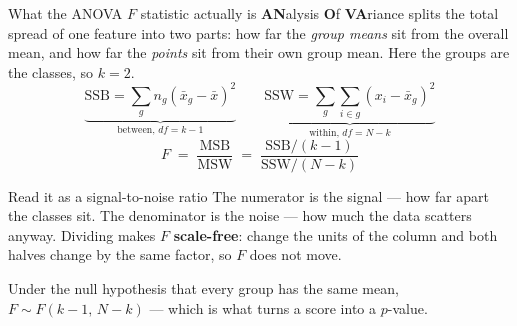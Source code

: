 \documentclass[aspectratio=169]{beamer}
\begin{document}
\begin{frame}[shrink=6]{What the ANOVA $F$ statistic actually is}
\textbf{AN}alysis \textbf{O}f \textbf{VA}riance splits the total spread of one
feature into two parts: how far the \emph{group means} sit from the overall
mean, and how far the \emph{points} sit from their own group mean. Here the
groups are the classes, so $k=2$.
\vspace{-0.2em}
\[
  \underbrace{\text{SSB} = \sum_{g} n_g (\bar{x}_g - \bar{x})^2}_{\text{between, } df = k-1}
  \qquad
  \underbrace{\text{SSW} = \sum_{g}\sum_{i \in g} (x_i - \bar{x}_g)^2}_{\text{within, } df = N-k}
\]
\[
  F \;=\; \frac{\text{MSB}}{\text{MSW}}
    \;=\; \frac{\text{SSB}/(k-1)}{\text{SSW}/(N-k)}
\]
\begin{block}{Read it as a signal-to-noise ratio}
  \small The numerator is the signal --- how far apart the classes sit. The
  denominator is the noise --- how much the data scatters anyway. Dividing
  makes $F$ \textbf{scale-free}: change the units of the column and both
  halves change by the same factor, so $F$ does not move.
\end{block}
\vspace{0.1em}
\begin{center}\small
  Under the null hypothesis that every group has the same mean,
  $F \sim F(k-1,\, N-k)$ --- which is what turns a score into a $p$-value.
\end{center}
\end{frame}
\end{document}
